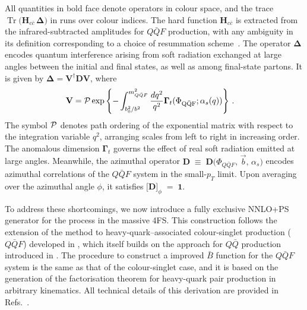 \documentclass[11pt,a4paper]{article}
\DeclareMathOperator{\Tr}{Tr}
\begin{document}
All quantities in bold face denote operators in colour space, and the trace $\Tr\bigl({\mathbf H}_{c\bar{c}}\,{\mathbf \Delta}\bigr)$
in  runs over colour indices.  The hard function \({\mathbf H}_{c\bar{c}}\) is extracted from the infrared-subtracted amplitudes for \(Q\bar{Q}F\) production, with any ambiguity in its definition corresponding to a choice of resummation scheme~\cite{Bozzi:2005wk}.  The operator \({\mathbf \Delta}\) encodes quantum interference arising from soft radiation exchanged at large angles between the initial and final states, as well as among final-state partons. It is given by ${\mathbf \Delta}={\mathbf V}^\dagger{\mathbf D}{\mathbf V}$, where
\begin{align}
\label{eq:soft}
{\mathbf V} &= {\cal
  P}\exp\left\{-\int_{b_0^2/b^2}^{m_{Q\bar{Q}F}^2}\frac{dq^2}{q^2}{\mathbf
  \Gamma}_t(\Phi_{\rm Q\bar{Q}F};\alpha_s(q))\right\}\,.%
\end{align}
The symbol \({\cal P}\) denotes path ordering of the exponential matrix with respect to the integration variable \(q^{2}\), arranging scales from left to right in increasing order.  The anomalous dimension \(\mathbf{\Gamma}_{t}\) governs the effect of real soft radiation emitted at large angles.  Meanwhile, the azimuthal operator $\mathbf{D} \;\equiv\; \mathbf{D}\bigl(\Phi_{Q\bar{Q}F},\,\vec{b},\,\alpha_{s}\bigr)$
encodes azimuthal correlations of the \(Q\bar{Q}F\) system in the small-\(p_{T}\) limit.  Upon averaging over the azimuthal angle \(\phi\), it satisfies
$\bigl[\mathbf{D}\bigr]_{\phi} \;=\; \mathbf{1}$.

To address these shortcomings, we now introduce a fully exclusive NNLO+PS generator for the \bbH{} process in the massive 4FS.  This construction follows the extension of the \minnlo{} method to heavy-quark–associated colour-singlet production (\(Q\bar{Q}F\)) developed in , which itself builds on the \minnlo{} approach for \(Q\bar{Q}\) production introduced in . The procedure to construct a \minnlo{} improved \(\bar{B}\) function for the \(Q\bar{Q}F\) system is the same as that of the colour-singlet case, and it is based on the generation of the factorisation theorem for heavy-quark pair production \cite{Zhu:2012ts,Li:2013mia,Catani:2014qha,Catani:2018mei} in arbitrary kinematics.  All technical details of this derivation are provided in Refs.~\cite{mazzitelli:2020jio,mazzitelli:2021mmm,mazzitelli:2024ura,Biello:2024pgo}.
\end{document}
